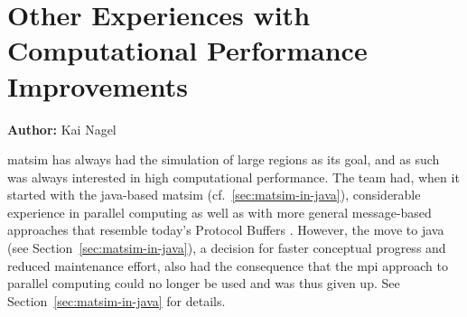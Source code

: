 
\chapter{Other Experiences with Computational Performance Improvements}
\label{ch:high-performance-computing}

\hfill \textbf{Author:} Kai Nagel


\gls{matsim} has always had the simulation of large regions as its goal, and as such was always interested in 
high computational performance.  The team had, when it started with the \gls{java}-based \gls{matsim} (cf.~\ref{sec:matsim-in-java}), considerable experience in parallel computing \citep{NagelSchleicher1994Microscopictrafficmodeling,RickertNagel1999hpcn99,NagelRickert2001parallel,CetinBurriNagel2003queue} as well as with more general message-based approaches \citep{GloorNagel2005ped-att04-birkh} that resemble today's Protocol Buffers 
\citep[][]{ProtocolBuffers_Webpage_2015}.
%
However, the move to \gls{java} (see Section~\ref{sec:matsim-in-java}), a decision for faster conceptual progress and reduced maintenance effort, also had the consequence that the \gls{mpi} approach to parallel computing could no longer be used and was thus given up.  See Section~\ref{sec:matsim-in-java} for details.



